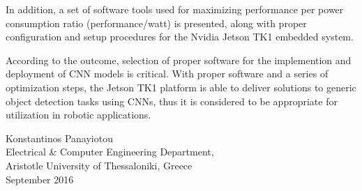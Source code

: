 {In addition, a set of software tools used for maximizing
performance per power consumption ratio (performance/watt) is presented,
along with proper configuration and
setup procedures for the Nvidia Jetson TK1 embedded system.

According to the outcome, selection of proper software for the implemention and
deployment of CNN models is critical. With proper software and a
series of optimization steps, the Jetson TK1 platform is able to
deliver solutions to generic object detection tasks using CNNs, thus it
is considered to be appropriate for utilization in robotic applications.


\begin{flushright}
  \vspace{2cm}
  Konstantinos Panayiotou
  \\
  Electrical \& Computer Engineering Department,
  \\
  Aristotle University of Thessaloniki, Greece
  \\
  September 2016
\end{flushright}

}
